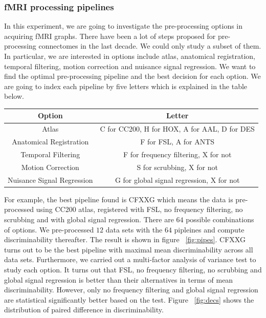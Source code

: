 \documentclass{article}
\begin{document}
\subsubsection{fMRI processing pipelines}
In this experiment, we are going to investigate the pre-processing options in acquiring fMRI graphs. There have been a lot of steps proposed for pre-processing connectomes in the last decade. We could only study a subset of them. In particular, we are interested in options include atlas, anatomical registration, temporal filtering, motion correction and nuisance signal regression. We want to find the optimal pre-processing pipeline and the best decision for each option. We are going to index each pipeline by five letters which is explained in the table below.   
\begin{center}
	\begin{tabular}{ |c|c| } 
		\hline
		Option & Letter  \\ \hline
		Atlas & C for CC200, H for HOX, A for AAL, D for DES  \\ \hline
		Anatomical Registration & F for FSL, A for ANTS \\ \hline
		Temporal Filtering & F for frequency filtering, X for not  \\ \hline
		Motion Correction & S for scrubbing, X for not  \\ \hline
		Nuisance Signal Regression & G for global signal regression, X for not  \\ \hline
	\end{tabular}
\end{center}
For example, the best pipeline found is CFXXG which means the data is pre-processed using CC200 atlas, registered with FSL, no frequency filtering, no scrubbing and with global signal regression. There are $64$ possible combinations of options. We pre-processed $12$ data sets with the $64$ pipleines and compute discriminability thereafter. The result is shown in figure ~\ref{fig:pipes}. CFXXG turns out to be the best pipeline with maximal mean discriminability across all data sets. Furthermore, we carried out a multi-factor analysis of variance test to study each option. It turns out that FSL, no frequency filtering, no scrubbing and global signal regression is better than their alternatives in terms of mean discriminability. However, only no frequency filtering and global signal regression are statistical significantly better based on the test. Figure ~\ref{fig:decs} shows the distribution of paired difference in discriminability.
\end{document}
